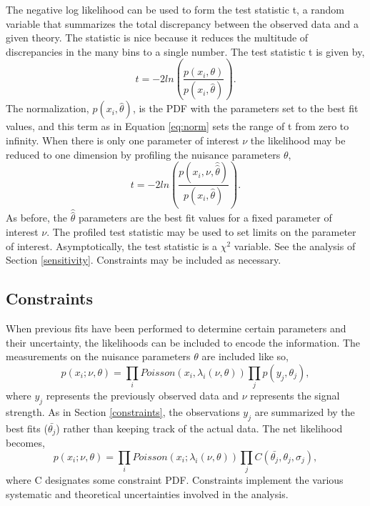 The negative log likelihood can be used to form the test statistic t, a random variable that summarizes the total discrepancy between the observed data and a given theory. The statistic is nice because it reduces the multitude of discrepancies in the many bins to a single number. The test statistic t is given by, 
\begin{equation}
t = -2ln\left(\frac{p(x_i,\theta)}{p(x_i,\hat{\theta})}\right).
\end{equation}
The normalization, $p(x_i,\hat{\theta})$, is the PDF with the parameters set to the best fit values, and this term as in Equation \ref{eq:norm} sets the range of t from zero to infinity. When there is only one parameter of interest $\nu$ the likelihood may be reduced to one dimension by profiling the nuisance parameters $\theta$,
\begin{equation}
t = -2ln\left(\frac{p(x_i,\nu,\hat{\hat{\theta}})}{p(x_i,\hat{\theta})}\right).
\end{equation}
As before, the $\hat{\hat{\theta}}$ parameters are the best fit values for a fixed parameter of interest $\nu$. The profiled test statistic may be used to set limits on the parameter of interest. Asymptotically, the test statistic is a $\chi^2$ variable. See the analysis of Section \ref{sensitivity}. Constraints may be included as necessary. 

\subsection{Constraints}

When previous fits have been performed to determine certain parameters and their uncertainty, the likelihoods can be included to encode the information. The measurements on the nuisance parameters $\theta$ are included like so,
\begin{equation}
p(x_i; \nu, \theta) = \prod_i Poisson(x_i, \lambda_i(\nu, \theta))\prod_j p(y_j, \theta_j),
\end{equation}
where $y_j$ represents the previously observed data and $\nu$ represents the signal strength. As in Section \ref{constraints}, the observations $y_j$ are summarized by the best fits ($\bar{\theta_j}$) rather than keeping track of the actual data. The net likelihood becomes,
\begin{equation}
p(x_i; \nu, \theta) = \prod_i Poisson(x_i; \lambda_i(\nu, \theta))\prod_j C(\bar{\theta_j}, \theta_j, \sigma_j),
\end{equation}
where C designates some constraint PDF. Constraints implement the various systematic and theoretical uncertainties involved in the analysis.  

